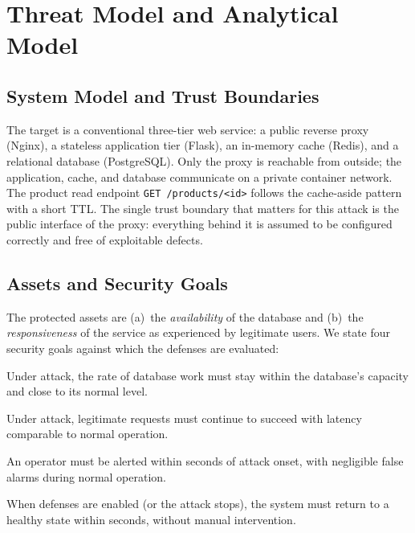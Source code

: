 \section{Threat Model and Analytical Model}
\label{sec:threat}

\subsection{System Model and Trust Boundaries}
The target is a conventional three-tier web service: a public reverse proxy (Nginx),
a stateless application tier (Flask), an in-memory cache (Redis), and a relational
database (PostgreSQL). Only the proxy is reachable from outside; the application,
cache, and database communicate on a private container network. The product read
endpoint \texttt{GET /products/<id>} follows the cache-aside pattern with a short TTL.
The single trust boundary that matters for this attack is the public interface of
the proxy: everything behind it is assumed to be configured correctly and free of
exploitable defects.

\subsection{Assets and Security Goals}
The protected assets are (a)~the \emph{availability} of the database and (b)~the
\emph{responsiveness} of the service as experienced by legitimate users. We state four
security goals against which the defenses are evaluated:
\begin{description}[leftmargin=1.2em,style=nextline]
\item[G1 -- Database protection.] Under attack, the rate of database work must stay
within the database's capacity and close to its normal level.
\item[G2 -- User availability.] Under attack, legitimate requests must continue to
succeed with latency comparable to normal operation.
\item[G3 -- Timely detection.] An operator must be alerted within seconds of attack
onset, with negligible false alarms during normal operation.
\item[G4 -- Fast recovery.] When defenses are enabled (or the attack stops), the system
must return to a healthy state within seconds, without manual intervention.
\end{description}

